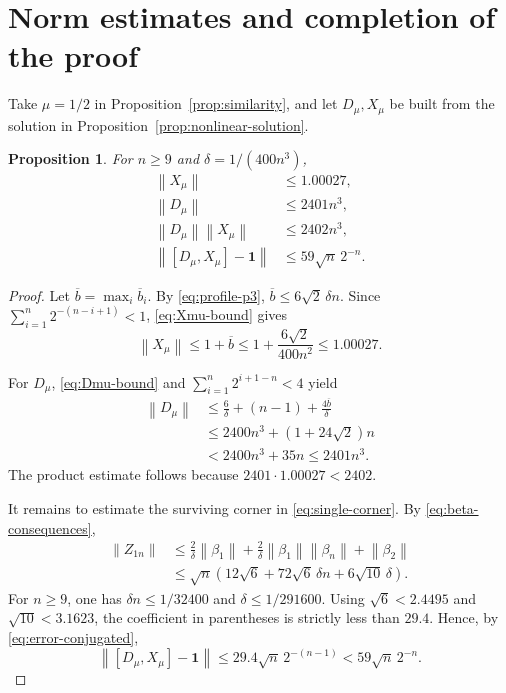 \documentclass[11pt]{amsart}
\numberwithin{equation}{section}
\newtheorem{proposition}[proposition]{Proposition}
\theoremstyle{remark}
\newcommand{\one}{\mathbf 1}
\newcommand{\norm}[1]{\left\lVert #1\right\rVert}
\begin{document}
\section{Norm estimates and completion of the proof}

Take $\mu=1/2$ in Proposition~\ref{prop:similarity}, and let $D_\mu,X_\mu$ be built from
the solution in Proposition~\ref{prop:nonlinear-solution}.

\begin{proposition}\label{prop:final-estimates}
For $n\geq9$ and $\delta=1/(400n^3)$,
\begin{align}
 \norm{X_\mu}&\leq1.00027,
 \label{eq:final-X}\\
 \norm{D_\mu}&\leq2401n^3,
 \label{eq:final-D}\\
 \norm{D_\mu}\norm{X_\mu}&\leq2402n^3,
 \label{eq:final-product}\\
 \norm{[D_\mu,X_\mu]-\one}&\leq59\sqrt n\,2^{-n}.
 \label{eq:final-error}
\end{align}
\end{proposition}

\begin{proof}
Let $\overline b=\max_i\overline b_i$.  By
\eqref{eq:profile-p3},
$\overline b\leq6\sqrt2\,\delta n$.  Since
$\sum_{i=1}^n2^{-(n-i+1)}<1$, \eqref{eq:Xmu-bound} gives
\[
 \norm{X_\mu}
 \leq1+\overline b
 \leq1+\frac{6\sqrt2}{400n^2}
 \leq1.00027.
\]

For $D_\mu$, \eqref{eq:Dmu-bound} and
$\sum_{i=1}^n2^{i+1-n}<4$ yield
\begin{align*}
 \norm{D_\mu}
 &\leq\frac6\delta+(n-1)+\frac{4\overline b}{\delta}\\
 &\leq2400n^3+(1+24\sqrt2)n\\
 &<2400n^3+35n
 \leq2401n^3.
\end{align*}
The product estimate follows because
$2401\cdot1.00027<2402$.

It remains to estimate the surviving corner in
\eqref{eq:single-corner}.  By \eqref{eq:beta-consequences},
\begin{align*}
 \norm{Z_{1n}}
 &\leq\frac2\delta\norm{\beta_1}
 +\frac2\delta\norm{\beta_1}\norm{\beta_n}
 +\norm{\beta_2}\\
 &\leq\sqrt n\left(
 12\sqrt6+72\sqrt6\,\delta n+6\sqrt{10}\,\delta
 \right).
\end{align*}
For $n\geq9$, one has
$\delta n\leq1/32400$ and $\delta\leq1/291600$.  Using
$\sqrt6<2.4495$ and $\sqrt{10}<3.1623$, the coefficient in parentheses is
strictly less than $29.4$.  Hence, by \eqref{eq:error-conjugated},
\[
 \norm{[D_\mu,X_\mu]-\one}
 \leq29.4\sqrt n\,2^{-(n-1)}
 <59\sqrt n\,2^{-n}.
\]
\end{proof}
\end{document}
